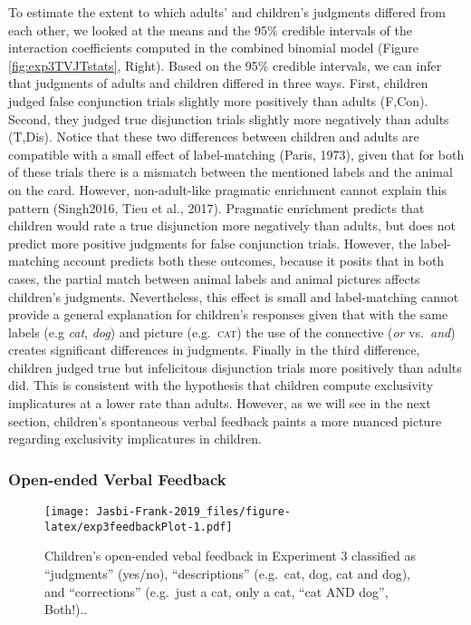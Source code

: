\documentclass[
  english,
  ,man,floatsintext]{apa6}
\begin{document}
To estimate the extent to which adults' and children's judgments differed from each other, we looked at the means and the 95\% credible intervals of the interaction coefficients computed in the combined binomial model (Figure \ref{fig:exp3TVJTstats}, Right). Based on the 95\% credible intervals, we can infer that judgments of adults and children differed in three ways. First, children judged false conjunction trials slightly more positively than adults (F,Con). Second, they judged true disjunction trials slightly more negatively than adults (T,Dis). Notice that these two differences between children and adults are compatible with a small effect of label-matching (Paris, 1973), given that for both of these trials there is a mismatch between the mentioned labels and the animal on the card. However, non-adult-like pragmatic enrichment cannot explain this pattern (Singh2016, Tieu et al., 2017). Pragmatic enrichment predicts that children would rate a true disjunction more negatively than adults, but does not predict more positive judgments for false conjunction trials. However, the label-matching account predicts both these outcomes, because it posits that in both cases, the partial match between animal labels and animal pictures affects children's judgments. Nevertheless, this effect is small and label-matching cannot provide a general explanation for children's responses given that with the same labels (e.g \emph{cat}, \emph{dog}) and picture (e.g.~\textsc{cat}) the use of the connective (\emph{or} vs.~\emph{and}) creates significant differences in judgments. Finally in the third difference, children judged true but infelicitous disjunction trials more positively than adults did. This is consistent with the hypothesis that children compute exclusivity implicatures at a lower rate than adults. However, as we will see in the next section, children's spontaneous verbal feedback paints a more nuanced picture regarding exclusivity implicatures in children.

\hypertarget{open-ended-verbal-feedback-1}{%
\subsubsection{Open-ended Verbal Feedback}\label{open-ended-verbal-feedback-1}}

\begin{figure}
\centering
\texttt{[image: Jasbi-Frank-2019\_files/figure-latex/exp3feedbackPlot-1.pdf]}
\caption{\label{fig:exp3feedbackPlot}Children's open-ended vebal feedback in Experiment 3 classified as \enquote{judgments} (yes/no), \enquote{descriptions} (e.g.~cat, dog, cat and dog), and \enquote{corrections} (e.g.~just a cat, only a cat, \enquote{cat AND dog}, Both!)..}
\end{figure}
\end{document}
